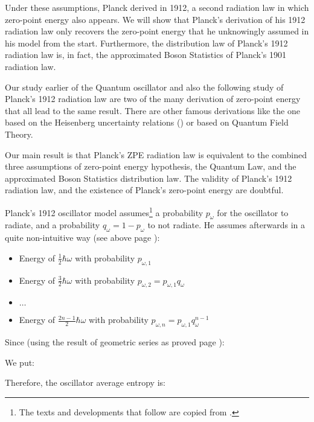 	Under these assumptions, Planck derived in 1912, a second radiation law in which zero-point energy also appears. We will show that Planck’s derivation of his 1912 radiation law only recovers the zero-point energy that he unknowingly assumed in his model from the start. Furthermore, the distribution law of Planck’s 1912 radiation law is, in fact, the approximated Boson Statistics of Planck’s 1901 radiation law.
	
	\begin{tcolorbox}[title=Remark,colframe=black,arc=10pt]
	Our study earlier of the Quantum oscillator and also the following study of Planck's 1912 radiation law are two of the many derivation of zero-point energy that all lead to the same result. There are other famous derivations like the one based on the Heisenberg uncertainty relations () or based on Quantum Field Theory.
	\end{tcolorbox}

	Our main result is that Planck’s ZPE radiation law is equivalent to the combined three assumptions of zero-point energy hypothesis, the Quantum Law, and the approximated Boson Statistics distribution law. The validity of Planck’s 1912 radiation law, and the existence of Planck’s zero-point energy are doubtful.
	
	Planck's 1912 oscillator model assumes\footnote{The texts and developments that follow are copied from \cite{dannon2005zero}.} a probability $p_{\omega}$ for the oscillator to radiate, and a probability $q_{\omega}=1-p_{\omega}$ to not radiate. He assumes afterwards in a quite non-intuitive way (see above page \pageref{zero point energy}):
	\begin{itemize}
		\item Energy of $\frac{1}{2} \hbar \omega$ with probability $p_{\omega, 1}$
		
		\item Energy of $\frac{3}{2} \hbar \omega$ with probability $p_{\omega, 2}=p_{\omega, 1} q_{\omega}$
		
		\item $\ldots$
		
		\item Energy of $\frac{2 n-1}{2} \hbar \omega$ with probability $p_{\omega, n}=p_{\omega, 1} q_{\omega}^{n-1}$
	\end{itemize}
	Since (using the result of geometric series as proved page \pageref{geometric series}):
	
	We put:
	
	Therefore, the oscillator average entropy is:
	
